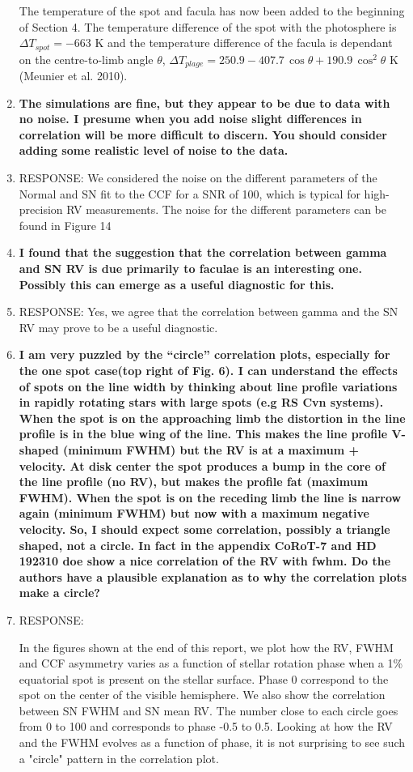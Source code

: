 \documentclass[11pt]{article}   	%
\begin{document}
\begin{enumerate}
{The temperature of the spot and facula has now been added to the beginning of Section 4. The temperature difference of the spot with the photosphere is $\Delta T_{spot} = -663$ K and the temperature difference of the facula is dependant on the centre-to-limb angle $\theta$,  $\Delta T_{plage} = 250.9 - 407.7\,\cos{\theta} + 190.9\,\cos^2 \theta$ K (Meunier et al. 2010). }
\bigskip
%
%
\item {\bf The simulations are fine, but they appear to be due to data with no noise. I presume when you add noise slight differences in correlation will be more difficult to discern. You should consider adding some realistic level of noise to the data.}
%
\item[]  RESPONSE:  We considered the noise on the different parameters of the Normal and SN fit to the CCF for a SNR of 100, which is typical for high-precision RV measurements. The noise for the different parameters can be found in Figure 14
\bigskip
%
%
\item {\bf I found that the suggestion that the correlation between gamma and SN RV is due primarily to faculae is an interesting one. Possibly this can emerge as a useful diagnostic for this.}
%
\item[]  RESPONSE:  Yes, we agree that the correlation between gamma and the SN RV may prove to be a useful diagnostic.
\bigskip
%
%
\item {\bf I am very puzzled by the ``circle'' correlation plots, especially for the one spot case(top right of Fig. 6). I can understand the effects of spots on the line width by thinking about line profile variations in rapidly rotating stars with large spots (e.g RS Cvn systems). When the spot is on the approaching limb the distortion in the line profile is in the blue wing of the line. This makes the line profile V-shaped (minimum FWHM) but the RV is at a maximum + velocity. At disk center the spot produces a bump in the core of the line profile (no RV), but makes the profile fat (maximum FWHM). When the spot is on the receding limb the line is narrow again (minimum FWHM) but now with a maximum negative velocity. So, I should expect some correlation, possibly a triangle shaped, not a circle. In fact in the appendix CoRoT-7 and HD 192310 doe show a nice correlation of the RV with fwhm. Do the authors have a plausible explanation as to why the correlation plots make a circle?}
%
\item[]  RESPONSE:  {\color{blue} In the figures shown at the end of this report, we plot how the RV, FWHM and CCF asymmetry varies as a function of stellar rotation phase when a 1\% equatorial spot is present on the stellar surface. Phase 0 correspond to the spot on the center of the visible hemisphere. We also show the correlation between SN FWHM and SN mean RV. The number close to each circle goes from 0 to 100 and corresponds to phase -0.5 to 0.5. Looking at how the RV and the FWHM evolves as a function of phase, it is not surprising to see such a "circle" pattern in the correlation plot.

}
\end{enumerate}
\end{document}

